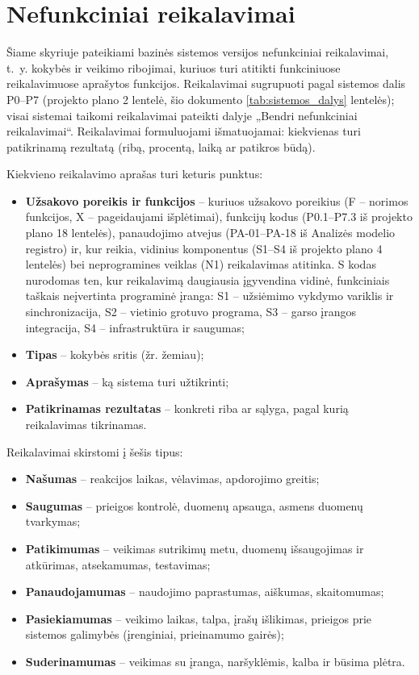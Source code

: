 \section{Nefunkciniai reikalavimai}

Šiame skyriuje pateikiami bazinės sistemos versijos nefunkciniai reikalavimai, t.~y. kokybės ir veikimo ribojimai, kuriuos turi atitikti funkciniuose reikalavimuose aprašytos funkcijos. Reikalavimai sugrupuoti pagal sistemos dalis P0--P7 (projekto plano 2 lentelė, šio dokumento \ref{tab:sistemos_dalys} lentelės); visai sistemai taikomi reikalavimai pateikti dalyje „Bendri nefunkciniai reikalavimai“. Reikalavimai formuluojami išmatuojamai: kiekvienas turi patikrinamą rezultatą (ribą, procentą, laiką ar patikros būdą).

Kiekvieno reikalavimo aprašas turi keturis punktus:
\begin{itemize}
    \item \textbf{Užsakovo poreikis ir funkcijos} -- kuriuos užsakovo poreikius (F -- norimos funkcijos, X -- pageidaujami išplėtimai), funkcijų kodus (P0.1--P7.3 iš projekto plano 18 lentelės), panaudojimo atvejus (PA-01--PA-18 iš Analizės modelio registro) ir, kur reikia, vidinius komponentus (S1--S4 iš projekto plano 4 lentelės) bei neprogramines veiklas (N1) reikalavimas atitinka. S kodas nurodomas ten, kur reikalavimą daugiausia įgyvendina vidinė, funkciniais taškais neįvertinta programinė įranga: S1 -- užsiėmimo vykdymo variklis ir sinchronizacija, S2 -- vietinio grotuvo programa, S3 -- garso įrangos integracija, S4 -- infrastruktūra ir saugumas;
    \item \textbf{Tipas} -- kokybės sritis (žr. žemiau);
    \item \textbf{Aprašymas} -- ką sistema turi užtikrinti;
    \item \textbf{Patikrinamas rezultatas} -- konkreti riba ar sąlyga, pagal kurią reikalavimas tikrinamas.
\end{itemize}

Reikalavimai skirstomi į šešis tipus:
\begin{itemize}
    \item \textbf{Našumas} -- reakcijos laikas, vėlavimas, apdorojimo greitis;
    \item \textbf{Saugumas} -- prieigos kontrolė, duomenų apsauga, asmens duomenų tvarkymas;
    \item \textbf{Patikimumas} -- veikimas sutrikimų metu, duomenų išsaugojimas ir atkūrimas, atsekamumas, testavimas;
    \item \textbf{Panaudojamumas} -- naudojimo paprastumas, aiškumas, skaitomumas;
    \item \textbf{Pasiekiamumas} -- veikimo laikas, talpa, įrašų išlikimas, prieigos prie sistemos galimybės (įrenginiai, prieinamumo gairės);
    \item \textbf{Suderinamumas} -- veikimas su įranga, naršyklėmis, kalba ir būsima plėtra.
\end{itemize}

